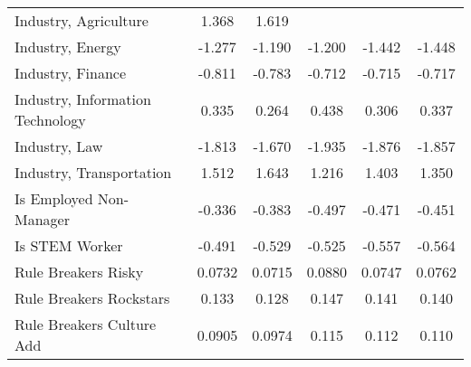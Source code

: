 {\begin{center}
{\begin{longtable}{l*{5}{c}}
\addlinespace
Industry, Agriculture    &       1.368         &       1.619\sym{*}  &                     &                     &                     \\
\addlinespace
Industry, Energy         &      -1.277\sym{*}  &      -1.190\sym{*}  &      -1.200\sym{*}  &      -1.442\sym{**} &      -1.448\sym{**} \\
\addlinespace
Industry, Finance &      -0.811\sym{***}&      -0.783\sym{***}&      -0.712\sym{***}&      -0.715\sym{***}&      -0.717\sym{***}\\
\addlinespace
Industry, Information Technology&       0.335         &       0.264         &       0.438\sym{*}  &       0.306         &       0.337         \\
\addlinespace
Industry, Law            &      -1.813\sym{***}&      -1.670\sym{**} &      -1.935\sym{***}&      -1.876\sym{***}&      -1.857\sym{***}\\
\addlinespace
Industry, Transportation &       1.512\sym{*}  &       1.643\sym{**} &       1.216         &       1.403\sym{*}  &       1.350\sym{*}  \\

\addlinespace

Is Employed Non-Manager  &      -0.336         &      -0.383\sym{*}  &      -0.497\sym{**} &      -0.471\sym{**} &      -0.451\sym{**} \\
\addlinespace
Is STEM Worker           &      -0.491\sym{**} &      -0.529\sym{**} &      -0.525\sym{**} &      -0.557\sym{**} &      -0.564\sym{**} \\

\addlinespace
Rule Breakers Risky      &      0.0732\sym{*}  &      0.0715\sym{*}  &      0.0880\sym{**} &      0.0747\sym{*}  &      0.0762\sym{*}  \\
\addlinespace
Rule Breakers Rockstars  &       0.133\sym{**} &       0.128\sym{**} &       0.147\sym{**} &       0.141\sym{**} &       0.140\sym{**} \\
\addlinespace
Rule Breakers Culture Add&      0.0905         &      0.0974\sym{*}  &       0.115\sym{**} &       0.112\sym{**} &       0.110\sym{**} \\




\end{longtable}}
\end{center}}
